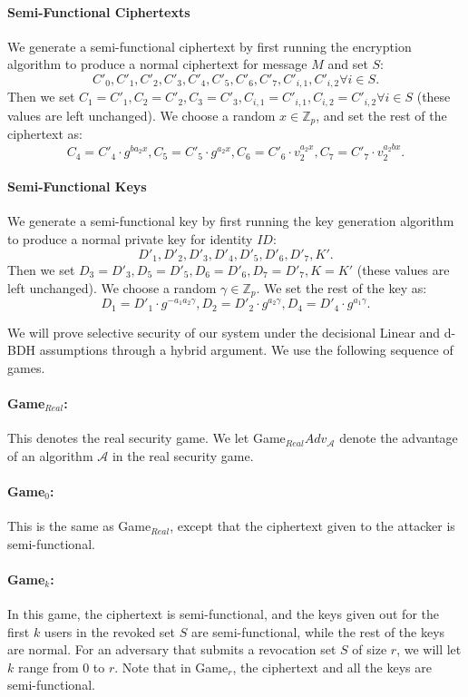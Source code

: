 \documentclass[a4paper, 11pt]{article}
\newcommand{\Z}{\ensuremath{\mathbb{Z}}}
\theoremstyle{definition}
\begin{document}
\paragraph{Semi-Functional Ciphertexts}
We generate a semi-functional ciphertext by first running the encryption algorithm to produce a normal ciphertext for message $M$ and set $S$:
\[C'_0, C'_1, C'_2, C'_3, C'_4, C'_5, C'_6, C'_7, C'_{i,1}, C'_{i,2} \forall i \in S.\] Then we set $C_1 = C'_1, C_2 = C'_2, C_3 = C'_3, C_{i,1} = C'_{i,1}, C_{i,2} = C'_{i,2} \forall i \in S$ (these values are left unchanged). We choose a random $x \in \Z_p$, and set the rest of the ciphertext as:
\[C_4 = C'_4\cdot g^{ba_2x}, C_5 = C'_5 \cdot g^{a_2x}, C_6 = C'_6\cdot v_2^{a_2 x}, C_7 = C'_7\cdot v_2^{a_2bx}.\]

\paragraph{Semi-Functional Keys}
We generate a semi-functional key by first running the key generation algorithm to produce a normal private key for identity $ID$:
\[D'_1, D'_2, D'_3, D'_4, D'_5, D'_6, D'_7, K'.\]
Then we set $D_3 = D'_3, D_5 = D'_5, D_6 = D'_6, D_7 = D'_7, K = K'$ (these values are left unchanged). We choose a random $\gamma \in \Z_p$. We set the rest of the key as:
\[D_1 = D'_1\cdot g^{-a_1 a_2 \gamma}, D_2 = D'_2 \cdot g^{a_2 \gamma}, D_4 = D'_4 \cdot g^{a_1 \gamma}.\]

We will prove selective security of our system under the decisional Linear and d-BDH assumptions through a hybrid argument. We use the following sequence of games.

\paragraph{Game$_{Real}$:} This denotes the real security game. We let Game$_{Real}Adv_{\mathcal{A}}$ denote the advantage of an algorithm $\mathcal{A}$ in the real security game.

\paragraph{Game$_0$:} This is the same as Game$_{Real}$, except that the ciphertext given to the attacker is semi-functional.

\paragraph{Game$_k$:} In this game, the ciphertext is semi-functional, and the keys given out for the first $k$ users in the revoked set $S$ are semi-functional, while the rest of the keys are normal. For an adversary that submits a revocation set $S$ of size $r$, we will let $k$ range from 0 to $r$. Note that in Game$_r$, the ciphertext and all the keys are semi-functional.
\end{document}
